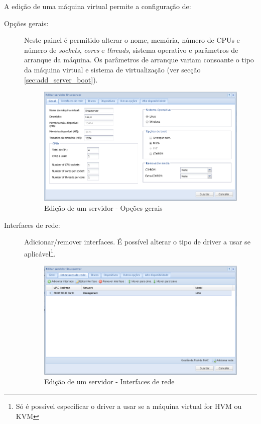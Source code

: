 A edição de uma máquina virtual permite a configuração de:
\begin{description}
	\item[Opções gerais:] Neste painel é permitido alterar o nome, memória, número de CPUs e número de \emph{sockets}, \emph{cores} e \emph{threads}, sistema operativo e parâmetros de arranque da máquina.
        Os parâmetros de arranque variam consoante o tipo da máquina virtual e sistema de virtualização (ver secção \ref{sec:add_server_boot}).
		\begin{figure}[H]
        		\begin{center}
		        \includegraphics[scale=0.5]{screenshots/server_edit_general.png}
        		\caption{Edição de um servidor - Opções gerais}
	        	\label{fig:server_edit_general}
	        	\end{center}
		\end{figure}

	\item[Interfaces de rede:] Adicionar/remover interfaces. É possível alterar o tipo de driver a usar se aplicável\footnote{Só é possível especificar o driver a usar se a máquina virtual for HVM ou KVM}.
		\begin{figure}[H]
        		\begin{center}
		        \includegraphics[scale=0.5]{screenshots/server_edit_interfaces.png}
        		\caption{Edição de um servidor - Interfaces de rede}
	        	\label{fig:server_edit_interfaces}
	        	\end{center}
		\end{figure}


\end{description}
